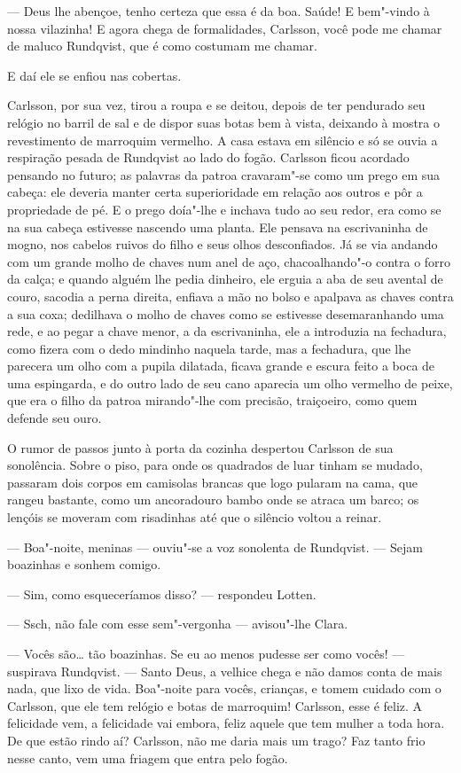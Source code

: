 --- Deus lhe abençoe, tenho certeza que essa é da boa. Saúde! E bem"-vindo à nossa
vilazinha! E agora chega de formalidades, Carlsson, você pode me chamar de
maluco Rundqvist, que é como costumam me chamar.

E daí ele se enfiou nas cobertas.

Carlsson, por sua vez, tirou a roupa e se deitou, depois de ter pendurado seu
relógio no barril de sal e de dispor suas botas bem à vista, deixando à mostra 
o revestimento de marroquim vermelho. A casa estava em silêncio e só
se ouvia a respiração pesada de Rundqvist ao lado do fogão. Carlsson ficou
acordado pensando no futuro; as palavras da patroa cravaram"-se como um prego em sua
cabeça: ele deveria manter certa superioridade em relação aos outros e pôr a
propriedade de pé. E o prego doía"-lhe e inchava tudo ao seu redor, era como se
na sua cabeça estivesse nascendo uma planta. Ele pensava na escrivaninha de
mogno, nos cabelos ruivos do filho e seus olhos desconfiados. Já se via andando
com um grande molho de chaves num anel de aço, chacoalhando"-o contra o forro da
calça; e quando alguém lhe pedia dinheiro, ele erguia a aba de seu avental de
couro, sacodia a perna direita, enfiava a mão no bolso e apalpava as chaves contra a
sua coxa; dedilhava o molho de chaves como se estivesse desemaranhando uma rede,
e ao pegar a chave menor, a da escrivaninha, ele a introduzia na fechadura, como
fizera com o dedo mindinho naquela tarde, mas a fechadura, que lhe parecera um
olho com a pupila dilatada, ficava grande e escura feito a boca de uma
espingarda, e do outro lado de seu cano aparecia um olho vermelho de peixe, que
era o filho da patroa mirando"-lhe com precisão, traiçoeiro, como quem defende seu ouro.

O rumor de passos junto à porta da cozinha despertou Carlsson de sua sonolência. Sobre o
piso, para onde os quadrados de luar tinham se mudado, passaram dois corpos em
camisolas brancas que logo pularam na cama, que rangeu bastante, como um
ancoradouro bambo onde se atraca um barco; os lençóis se moveram com
risadinhas até que o silêncio voltou a reinar.

--- Boa"-noite, meninas --- ouviu"-se a voz sonolenta de Rundqvist. --- Sejam
boazinhas e sonhem comigo.

--- Sim, como esqueceríamos disso? --- respondeu Lotten.

--- Ssch, não fale com esse sem"-vergonha --- avisou"-lhe Clara.

--- Vocês são\ldots{} tão boazinhas. Se eu ao menos pudesse ser como vocês! ---
suspirava Rundqvist. --- Santo Deus, a velhice chega e não damos conta de mais
nada, que lixo de vida. Boa"-noite para vocês, crianças, e tomem cuidado com o
Carlsson, que ele tem relógio e botas de marroquim! Carlsson, esse é feliz. A
felicidade vem, a felicidade vai embora, feliz aquele que tem mulher a toda
hora. De que estão rindo aí? Carlsson, não me daria mais um trago? Faz tanto
frio nesse canto, vem uma friagem que entra pelo fogão.

